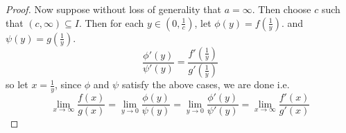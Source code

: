 \begin{proof}
    Now suppose without loss of generality that $a = \infty$. Then choose $c$ such that 
    $(c,\infty) \subseteq I$. Then for each  $y \in (0,\frac{1}{c})$, let $\phi(y)=f(\frac{1}{y})$. 
    and $\psi(y)=g(\frac{1}{y})$. 
        \begin{equation*}
            \frac{\phi'(y)}{\psi'(y)}=\frac{f'(\frac{1}{y})}{g'(\frac{1}{y})}
        \end{equation*}
    so let $x=\frac{1}{y}$, since $\phi$ and  $\psi$ satisfy the above cases, we are done i.e.
        \begin{equation*}
            \lim_{x \rightarrow \infty}{\frac{f(x)}{g(x)}}=
            \lim_{y \rightarrow 0}{\frac{\phi(y)}{\psi(y)}}=
            \lim_{y \rightarrow 0}{\frac{\phi'(y)}{\psi'(y)}}=
            \lim_{x \rightarrow \infty}{\frac{f'(x)}{g'(x)}}
        \end{equation*} 
\end{proof}
